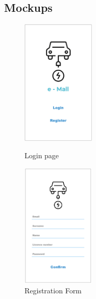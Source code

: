\documentclass[../main.tex]{subfiles}
\begin{document}


\subsection{Mockups}

\begin{figure}[!htb]
  \centering
  \begin{minipage}[b]{0.3\textwidth}
    \includegraphics[width=35mm]{Mockups/mk_mainpage.png}
    \caption{Login page}
    \label{mk:mainpage}
  \end{minipage}
  \hfill
  \begin{minipage}[b]{0.3\textwidth}
    \includegraphics[width=35mm]{Mockups/mk_signuppage.png}
    \caption{Registration Form}
    \label{mk:signup}
  \end{minipage}
\end{figure}
\end{document}
